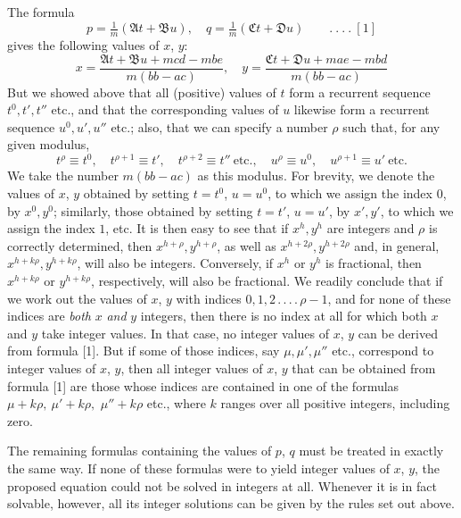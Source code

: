 The formula
\[
p=\tfrac{1}{m}(\mathfrak{A}t+\mathfrak{B}u),\quad
q=\tfrac{1}{m}(\mathfrak{C}t+\mathfrak{D}u)\qquad .\ .\ .\ .\ [1]
\]
gives the following values of $x$, $y$:
\[
x=\frac{\mathfrak{A}t+\mathfrak{B}u+mcd-mbe}{m(bb-ac)},\quad
y=\frac{\mathfrak{C}t+\mathfrak{D}u+mae-mbd}{m(bb-ac)}
\]
But we showed above that all (positive) values of $t$ form a recurrent sequence $t^0,t',t''$ etc., and that the corresponding values of $u$ likewise form a recurrent sequence $u^0,u',u''$ etc.; also, that we can specify a number $\rho$ such that, for any given modulus,
\[
t^\rho\equiv t^0,\quad t^{\rho+1}\equiv t',\quad t^{\rho+2}\equiv t''\ \text{etc.},\quad
u^\rho\equiv u^0,\quad u^{\rho+1}\equiv u'\ \text{etc.}
\]
We take the number $m(bb-ac)$ as this modulus. For brevity, we denote the values of $x$, $y$ obtained by setting $t=t^0$, $u=u^0$, to which we assign the index $0$, by $x^0,y^0$; similarly, those obtained by setting $t=t'$, $u=u'$, by $x',y'$, to which we assign the index $1$, etc. It is then easy to see that if $x^h,y^h$ are integers and $\rho$ is correctly determined, then $x^{h+\rho},y^{h+\rho}$, as well as $x^{h+2\rho},y^{h+2\rho}$ and, in general, $x^{h+k\rho},y^{h+k\rho}$, will also be integers. Conversely, if $x^h$ or $y^h$ is fractional, then $x^{h+k\rho}$ or $y^{h+k\rho}$, respectively, will also be fractional. We readily conclude that if we work out the values of $x$, $y$ with indices $0,1,2\,.\,.\,.\,.\,\rho-1$, and for none of these indices are \textit{both} $x$ \textit{and} $y$ integers, then there is no index at all for which both $x$ and $y$ take integer values. In that case, no integer values of $x$, $y$ can be derived from formula [1]. But if some of those indices, say $\mu,\mu',\mu''$ etc., correspond to integer values of $x$, $y$, then all integer values of $x$, $y$ that can be obtained from formula [1] are those whose indices are contained in one of the formulas $\mu+k\rho,\ \mu'+k\rho,$
$\mu''+k\rho$ etc., where $k$ ranges over all positive integers, including zero.

The remaining formulas containing the values of $p$, $q$ must be treated in exactly the same way. If none of these formulas were to yield integer values of $x$, $y$, the proposed equation could not be solved in integers at all. Whenever it is in fact solvable, however, all its integer solutions can be given by the rules set out above.

